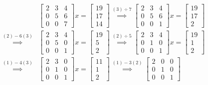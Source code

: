 \begin{align*}
    &\begin{bmatrix} 2 & 3 & 4 \\ 0 & 5 & 6 \\ 0 & 0 & 7 \end{bmatrix}
    x
    =
    \begin{bmatrix} 19 \\ 17 \\ 14 \end{bmatrix}
    \stackrel{(3)\div 7}{\implies}
    \begin{bmatrix} 2 & 3 & 4 \\ 0 & 5 & 6 \\ 0 & 0 & 1 \end{bmatrix}
    x
    =
    \begin{bmatrix} 19 \\ 17 \\ 2 \end{bmatrix}
    \\
    \stackrel{(2)-6(3)}{\implies}
    &\begin{bmatrix} 2 & 3 & 4 \\ 0 & 5 & 0 \\ 0 & 0 & 1 \end{bmatrix}
    x
    =
    \begin{bmatrix} 19 \\ 5 \\ 2 \end{bmatrix}
    \stackrel{(2)\div 5}{\implies}
    \begin{bmatrix} 2 & 3 & 4 \\ 0 & 1 & 0 \\ 0 & 0 & 1 \end{bmatrix}
    x
    =
    \begin{bmatrix} 19 \\ 1 \\ 2 \end{bmatrix}
    \\
    \stackrel{(1)-4(3)}{\implies}
    &\begin{bmatrix} 2 & 3 & 0 \\ 0 & 1 & 0 \\ 0 & 0 & 1 \end{bmatrix}
    x
    =
    \begin{bmatrix} 11 \\ 1 \\ 2 \end{bmatrix}
    \stackrel{(1)-3(2)}{\implies}
    \begin{bmatrix} 2 & 0 & 0 \\ 0 & 1 & 0 \\ 0 & 0 & 1 \end{bmatrix}

\end{align*}
